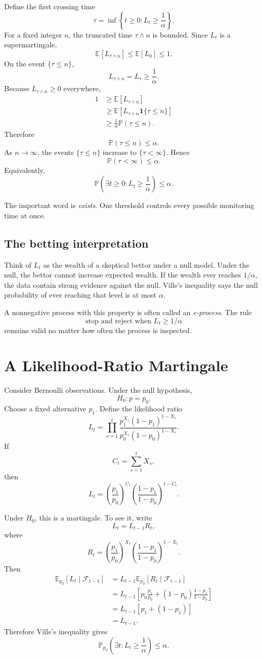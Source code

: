 \documentclass[en,nofont,11pt]{elegantbook}
\newcommand{\E}{\mathbb{E}}
\newcommand{\Pbb}{\mathbb{P}}
\newcommand{\one}{\mathbf{1}}
\newcommand{\F}{\mathcal{F}}
\begin{document}
Define the first crossing time
\[
\tau=\inf\left\{t\ge0:L_t\ge\frac1\alpha\right\}.
\]
For a fixed integer $n$, the truncated time $\tau\wedge n$ is bounded. Since $L_t$ is a supermartingale,
\[
\E[L_{\tau\wedge n}]
\le
\E[L_0]
\le1.
\]
On the event $\{\tau\le n\}$,
\[
L_{\tau\wedge n}=L_\tau\ge\frac1\alpha.
\]
Because $L_{\tau\wedge n}\ge0$ everywhere,
\begin{align*}
1
&\ge\E[L_{\tau\wedge n}]\\
&\ge\E\left[L_{\tau\wedge n}\one\{\tau\le n\}\right]\\
&\ge\frac1\alpha\Pbb(\tau\le n).
\end{align*}
Therefore
\[
\Pbb(\tau\le n)\le\alpha.
\]
As $n\to\infty$, the events $\{\tau\le n\}$ increase to $\{\tau<\infty\}$. Hence
\[
\Pbb(\tau<\infty)\le\alpha.
\]
Equivalently,
\[
\boxed{
\Pbb\left(\exists t\ge0:L_t\ge\frac1\alpha\right)
\le\alpha.
}
\]

The important word is \emph{exists}. One threshold controls every possible monitoring time at once.

\section{The betting interpretation}

Think of $L_t$ as the wealth of a skeptical bettor under a null model. Under the null, the bettor cannot increase expected wealth. If the wealth ever reaches $1/\alpha$, the data contain strong evidence against the null. Ville's inequality says the null probability of ever reaching that level is at most $\alpha$.

A nonnegative process with this property is often called an \emph{e-process}. The rule
\[
\text{stop and reject when }L_t\ge 1/\alpha
\]
remains valid no matter how often the process is inspected.

\chapter{A Likelihood-Ratio Martingale}

Consider Bernoulli observations. Under the null hypothesis,
\[
H_0:p=p_0.
\]
Choose a fixed alternative $p_1$. Define the likelihood ratio
\[
L_t
=
\prod_{s=1}^{t}
\frac{p_1^{X_s}(1-p_1)^{1-X_s}}
     {p_0^{X_s}(1-p_0)^{1-X_s}}.
\]
If
\[
C_t=\sum_{s=1}^{t}X_s,
\]
then
\[
L_t
=
\left(\frac{p_1}{p_0}\right)^{C_t}
\left(\frac{1-p_1}{1-p_0}\right)^{t-C_t}.
\]

Under $H_0$, this is a martingale. To see it, write
\[
L_t=L_{t-1}R_t,
\]
where
\[
R_t
=
\left(\frac{p_1}{p_0}\right)^{X_t}
\left(\frac{1-p_1}{1-p_0}\right)^{1-X_t}.
\]
Then
\begin{align*}
\E_{p_0}[L_t\mid\F_{t-1}]
&=L_{t-1}\E_{p_0}[R_t\mid\F_{t-1}]\\
&=L_{t-1}\left[
 p_0\frac{p_1}{p_0}
 +(1-p_0)\frac{1-p_1}{1-p_0}
\right]\\
&=L_{t-1}[p_1+(1-p_1)]\\
&=L_{t-1}.
\end{align*}
Therefore Ville's inequality gives
\[
\Pbb_{p_0}\left(\exists t:L_t\ge\frac1\alpha\right)
\le\alpha.
\]
\end{document}
